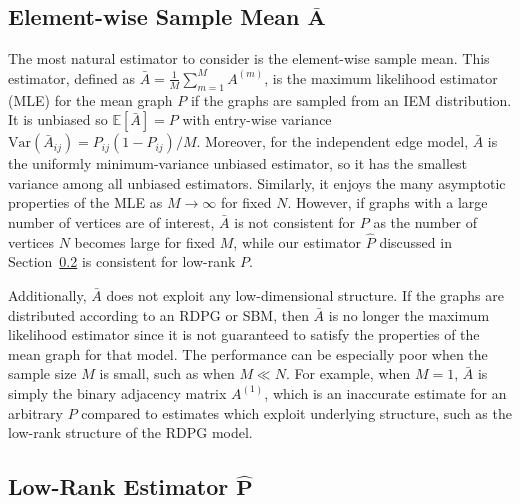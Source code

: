 \documentclass[journal,twoside,web]{ieeecolor}
\newcommand{\Ex}{\mathbb{E}}
\begin{document}
\subsection[Element-wise Sample Mean]{Element-wise Sample Mean $\bm{\bar{A}}$}
\label{sec:abar}

The most natural estimator to consider is the element-wise sample mean.
This estimator, defined as $\bar{A}=\frac{1}{M}\sum_{m=1}^M A^{(m)}$, is the  maximum likelihood estimator (MLE) for the mean graph $P$ if the graphs are sampled from an IEM distribution.
It is unbiased so $\Ex[\bar{A}]=P$ with entry-wise variance $\mathrm{Var}(\bar{A}_{ij}) = P_{ij} (1-P_{ij})/M$. 
Moreover, for the independent edge model, $\bar{A}$ is the uniformly minimum-variance unbiased estimator, so it has the smallest variance among all unbiased estimators.
Similarly, it enjoys the many asymptotic properties of the MLE as $M\to \infty$ for fixed $N$.
However, if graphs with a large number of vertices are of interest, $\bar{A}$ is not consistent for $P$ as the number of vertices $N$ becomes large for fixed $M$, while our estimator $\hat{P}$ discussed in Section~\ref{sec:phat} is consistent for low-rank $P$.

Additionally, $\bar{A}$ does not exploit any low-dimensional structure.
If the graphs are distributed according to an RDPG or SBM, then $\bar{A}$ is no longer the maximum likelihood estimator since it is not guaranteed to satisfy the properties of the mean graph for that model.
The performance can be especially poor when the sample size $M$ is small, such as when $M\ll N$.
For example, when $M=1$, $\bar{A}$ is simply the binary adjacency matrix $A^{(1)}$, which is an inaccurate estimate for an arbitrary $P$ compared to estimates which exploit underlying structure, such as the low-rank structure of the RDPG model.

\subsection[Low-Rank Estimator]{Low-Rank Estimator $\bm{\hat{P}}$}
\label{sec:phat}
\end{document}
